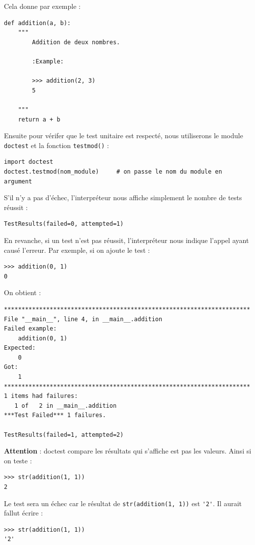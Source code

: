 \documentclass[12pt, a4paper]{article}
\begin{document}
Cela donne par exemple :
\begin{lstlisting}
def addition(a, b):
    """
        Addition de deux nombres.
        
        :Example:
        
        >>> addition(2, 3)
        5
        
    """
    return a + b
\end{lstlisting}

Ensuite pour vérifer que le test unitaire est respecté, nous utiliserons le module \lstinline{doctest} et la fonction \lstinline{testmod()} :
\begin{lstlisting}
import doctest
doctest.testmod(nom_module) 	# on passe le nom du module en argument
\end{lstlisting}

S'il n'y a pas d'échec, l'interpréteur nous affiche simplement le nombre de tests réussit :
\begin{lstlisting}
TestResults(failed=0, attempted=1)
\end{lstlisting}

En revanche, si un test n'est pas réussit, l'interpréteur nous indique l'appel ayant causé l'erreur. Par exemple, si on ajoute le test :
\begin{lstlisting}
>>> addition(0, 1)
0        
\end{lstlisting}

On obtient :
\begin{lstlisting}
**********************************************************************
File "__main__", line 4, in __main__.addition
Failed example:
    addition(0, 1)
Expected:
    0
Got:
    1
**********************************************************************
1 items had failures:
   1 of   2 in __main__.addition
***Test Failed*** 1 failures.

TestResults(failed=1, attempted=2)
\end{lstlisting}

\textbf{Attention} : doctest compare les résultats qui s'affiche est pas les valeurs. Ainsi si on teste :
\begin{lstlisting}
>>> str(addition(1, 1))
2      
\end{lstlisting}

Le test sera un échec car le résultat de \lstinline{str(addition(1, 1))} est \lstinline{'2'}. Il aurait fallut écrire :
\begin{lstlisting}
>>> str(addition(1, 1))
'2'
\end{lstlisting}
\end{document}
